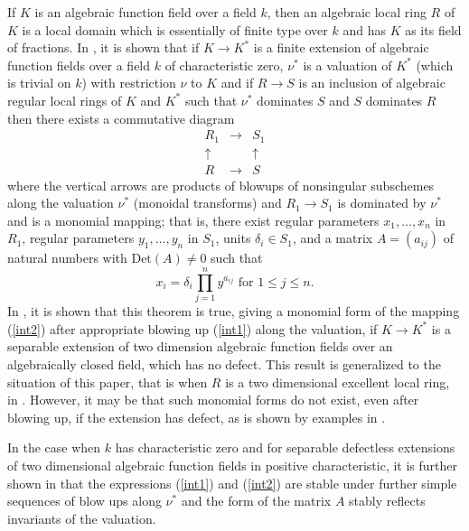 \documentclass[11pt]{amsart}
\begin{document}
If $K$ is an algebraic function field over a field $k$, then 
an algebraic local ring $R$ of $K$ is a local  domain which is essentially of finite type over $k$ and has $K$ as its field of fractions. 
In \cite{C}, it is shown that if $K\rightarrow K^*$ is a finite extension of algebraic function fields over a field $k$ of characteristic zero, $\nu^*$ is a valuation of $K^*$ (which is trivial on $k$) with restriction $\nu$ to $K$ and if $R\rightarrow S$ is an inclusion of algebraic regular local rings of $K$ and $K^*$ such that $\nu^*$ dominates $S$ and $S$ dominates $R$ then there exists a commutative diagram
\begin {equation}\label{int1}
\begin{array}{ccc}
R_1&\rightarrow &S_1\\
\uparrow&&\uparrow\\
R&\rightarrow&S
\end{array}
\end{equation}
where the vertical arrows are products of blowups of nonsingular subschemes along the valuation $\nu^*$ (monoidal transforms) and $R_1\rightarrow S_1$ is dominated by $\nu^*$ and is  a monomial mapping; that is, there exist regular parameters $x_1,\ldots,x_n$ in $R_1$, regular parameters  $y_1,\ldots,y_n$ in $S_1$, units $\delta_i\in S_1$, and a matrix $A=(a_{ij})$ of natural numbers  with $\mbox{Det}(A)\ne 0$ such that
 \begin{equation}\label{int2}
 x_i=\delta_i\prod_{j=1}^ny^{a_{ij}}\mbox{ for $1\le j\le n$}.
 \end{equation}
In \cite{CP}, it is shown that this theorem is true, giving a monomial form of the mapping (\ref{int2}) after appropriate blowing up  (\ref{int1}) along the valuation, if $K\rightarrow K^*$ is a separable extension of two dimension algebraic function fields over an algebraically closed field, which has no defect. This result is generalized to the situation of this paper, that is when $R$ is a  two dimensional excellent  local ring, in  \cite{C12}. However, it may  be that such  monomial forms do not exist, even after  blowing up, if the extension has defect, as is shown by examples in \cite{C2}.
 
 In the case when $k$ has characteristic zero and for separable defectless extensions of two dimensional algebraic function fields in positive characteristic, it is further shown in \cite{CP} that  the expressions (\ref{int1}) and (\ref{int2}) are stable under further simple sequences of blow ups along $\nu^*$ and the form of the matrix $A$ stably reflects invariants of the valuation. 
\end{document}
